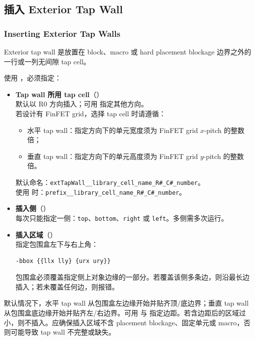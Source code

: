 \subsection{插入 Exterior Tap Wall}
\subsubsection*{Inserting Exterior Tap Walls}

Exterior tap wall 是放置在 block、macro 或 hard placement blockage 边界之外的一行或一列无间隙 tap cell。

使用 ，必须指定：
\begin{itemize}
  \item \textbf{Tap wall 所用 tap cell}（）\\
        默认以 R0 方向插入；可用  指定其他方向。\\
        若设计有 FinFET grid，选择 tap cell 时请遵循：
        \begin{itemize}
          \item 水平 tap wall：指定方向下的单元宽度须为 FinFET grid $x$-pitch 的整数倍；
          \item 垂直 tap wall：指定方向下的单元高度须为 FinFET grid $y$-pitch 的整数倍。
        \end{itemize}
        默认命名：\texttt{extTapWall\_\_library\_cell\_name\_R\#\_C\#\_number}。\\
        使用  时：\texttt{prefix\_\_library\_cell\_name\_R\#\_C\#\_number}。
  \item \textbf{插入侧}（）\\
        每次只能指定一侧：\texttt{top}、\texttt{bottom}、\texttt{right} 或 \texttt{left}。多侧需多次运行。
  \item \textbf{插入区域}（）\\
        指定包围盒左下与右上角：
\begin{lstlisting}
-bbox {{llx lly} {urx ury}}
\end{lstlisting}
        包围盒必须覆盖指定侧上对象边缘的一部分。若覆盖该侧多条边，则沿最长边插入；若未覆盖任何边，则报错。
\end{itemize}

默认情况下，水平 tap wall 从包围盒左边缘开始并贴齐顶/底边界；垂直 tap wall 从包围盒底边缘开始并贴齐左/右边界。可用  与  指定边距。若含边距后的区域过小，则不插入。应确保插入区域不含 placement blockage、固定单元或 macro，否则可能导致 tap wall 不完整或缺失。

